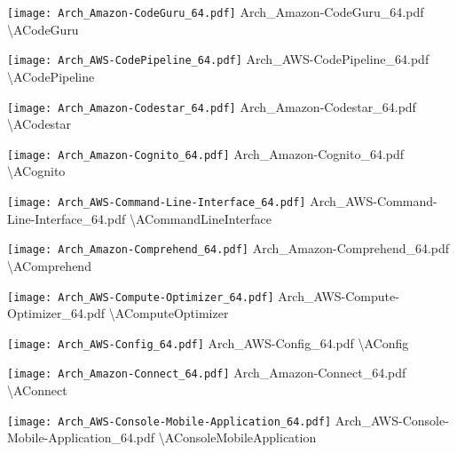  {\texttt{[image: Arch\_Amazon-CodeGuru\_64.pdf]}} {Arch\_Amazon-CodeGuru\_64.pdf} {{\textbackslash}ACodeGuru}

 {\texttt{[image: Arch\_AWS-CodePipeline\_64.pdf]}} {Arch\_AWS-CodePipeline\_64.pdf} {{\textbackslash}ACodePipeline}

 {\texttt{[image: Arch\_Amazon-Codestar\_64.pdf]}} {Arch\_Amazon-Codestar\_64.pdf} {{\textbackslash}ACodestar}

 {\texttt{[image: Arch\_Amazon-Cognito\_64.pdf]}} {Arch\_Amazon-Cognito\_64.pdf} {{\textbackslash}ACognito}

 {\texttt{[image: Arch\_AWS-Command-Line-Interface\_64.pdf]}} {Arch\_AWS-Command-Line-Interface\_64.pdf} {{\textbackslash}ACommandLineInterface}

 {\texttt{[image: Arch\_Amazon-Comprehend\_64.pdf]}} {Arch\_Amazon-Comprehend\_64.pdf} {{\textbackslash}AComprehend}

 {\texttt{[image: Arch\_AWS-Compute-Optimizer\_64.pdf]}} {Arch\_AWS-Compute-Optimizer\_64.pdf} {{\textbackslash}AComputeOptimizer}

 {\texttt{[image: Arch\_AWS-Config\_64.pdf]}} {Arch\_AWS-Config\_64.pdf} {{\textbackslash}AConfig}

 {\texttt{[image: Arch\_Amazon-Connect\_64.pdf]}} {Arch\_Amazon-Connect\_64.pdf} {{\textbackslash}AConnect}

 {\texttt{[image: Arch\_AWS-Console-Mobile-Application\_64.pdf]}} {Arch\_AWS-Console-Mobile-Application\_64.pdf} {{\textbackslash}AConsoleMobileApplication}

